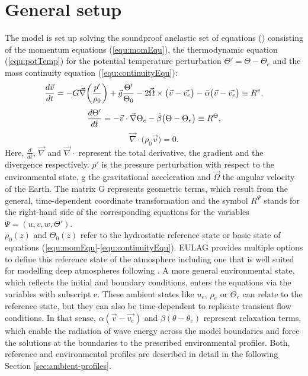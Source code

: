 \section{General setup}
\label{sec:eulag-setup}
The model is set up solving the soundproof anelastic set of equations (\cite{lipps_scale_1982}) consisting of the momentum equations (\ref{equ:momEqu}), the thermodynamic equation (\ref{equ:potTemp}) for the potential temperature perturbation $\Theta'=\Theta-\Theta_e$ and the mass continuity equation (\ref{equ:continuityEqu}):
%
\begin{equation}
\begin{aligned}
    \frac{d \Vec{v}}{dt} = -G \Vec{\nabla} \biggl(\frac{p'}{\rho_0}\biggr) +  \Vec{g} \frac{\Theta'}{\Theta_0} - 2 \Vec{\Omega} \times \bigl(\Vec{v}-\Vec{v_e}\bigr) - \Tilde{\alpha} \bigl(\Vec{v}-\Vec{v_e}\bigr) \equiv R^{v},
    \label{equ:momEqu}
\end{aligned}
\end{equation}
\begin{equation}
    \frac{d \Theta'}{dt} = -\Vec{v} \cdot \Vec{\nabla} \Theta_e - \Tilde{\beta} \bigl(\Theta-\Theta_e\bigr) \equiv R^{\Theta},
    \label{equ:potTemp}
\end{equation}
\begin{equation}
    \Vec{\nabla} \cdot \bigl(\rho_0 \Vec{v}\bigr) = 0.
    \label{equ:continuityEqu}
\end{equation}
%
Here, $\frac{d}{dt}$, $\Vec{\nabla}$ and $\Vec{\nabla} \cdot$ represent the total derivative, the gradient and the divergence respectively. $p'$ is the pressure perturbation with respect to the environmental state, g the gravitational acceleration and $\Vec{\Omega}$ the angular velocity of the Earth. The matrix G represents geometric terms, which result from the general, time-dependent coordinate transformation and the symbol $R^{\Psi}$ stands for the right-hand side of the corresponding equations for the variables $\Psi = (u,v,w,\Theta')$. \\
$\rho_0(z)$ and $\Theta_0(z)$ refer to the hydrostatic reference state or basic state of equations (\ref{equ:momEqu}-\ref{equ:continuityEqu}). EULAG provides multiple options to define this reference state of the atmosphere including one that is well suited for modelling deep atmospheres following \textcite{bacmeister_breakdown_1989}. A more general environmental state, which reflects the initial and boundary conditions, enters the equations via the variables with subscript e. These ambient states like $u_e$, $\rho_e$ or $\Theta_e$ can relate to the reference state, but they can also be time-dependent to replicate transient flow conditions. In that sense, $\alpha(\Vec{v}-\Vec{v_e})$ and $\beta(\theta-\theta_e)$ represent relaxation terms, which enable the radiation of wave energy across the model boundaries and force the solutions at the boundaries to the prescribed environmental profiles. Both, reference and environmental profiles are described in detail in the following Section \ref{sec:ambient-profiles}. \\
